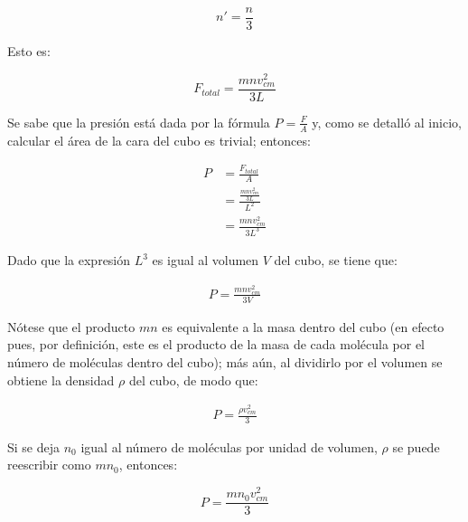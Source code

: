 \documentclass{article}
\begin{document}
\[
    n' = \frac{n}{3}
\]

Esto es:

\[
    F_{total} = \frac{m n v_{cm}^2}{3 L}
\]

Se sabe que la presión está dada por la fórmula \(P = \frac{F}{A}\)
y, como se detalló al inicio, calcular el área de la cara
del cubo es trivial; entonces:

\begin{align*}
    P   &= \frac{F_{total}}{A} \\
        &= \frac{\frac{m n v_{cm}^2}{3 L}}{L^2} \\
        &= \frac{m n v_{cm}^2}{3 L^3}
\end{align*}

Dado que la expresión \(L^3\) es igual al volumen \(V\) del cubo,
se tiene que:

\begin{align*}
    P = \frac{m n v_{cm}^2}{3 V}
\end{align*}

Nótese que el producto \(m n\) es equivalente a la masa
dentro del cubo (en efecto pues, por definición, este es el producto
de la masa de cada molécula por el número de moléculas dentro
del cubo); más aún, al dividirlo por el volumen se obtiene la 
densidad \(\rho\) del cubo, de modo que:

\begin{align}
    P = \frac{\rho v_{cm}^2}{3}
\end{align}

Si se deja \(n_0\) igual al número de moléculas por unidad 
de volumen, \(\rho\) se puede reescribir como \(m n_0\), entonces:

\[
    P = \frac{m n_0 v_{cm}^2}{3}
\]
\end{document}
